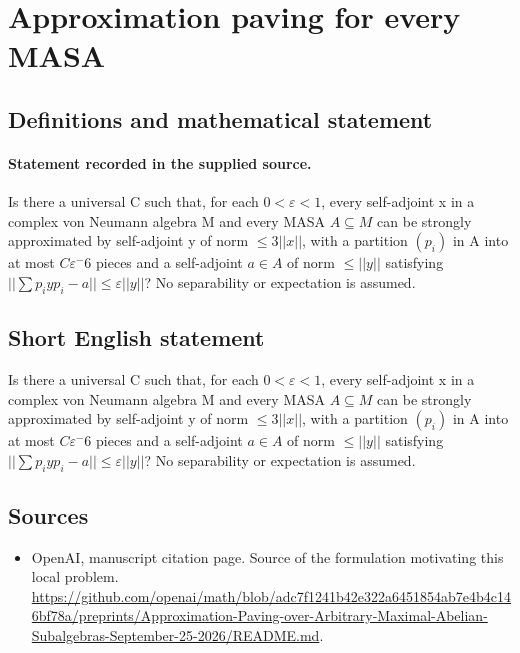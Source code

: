 \documentclass[11pt]{article}
\begin{document}
\section*{Approximation paving for every MASA}\label{statement}
\subsection{Definitions and mathematical statement}
\paragraph{Statement recorded in the supplied source.}
Is there a universal C such that, for each $0<\varepsilon <1$, every self-adjoint x in a complex von Neumann algebra M and every MASA $A\subseteq M$ can be strongly approximated by self-adjoint y of norm $\leq 3||x||$, with a partition $(p_i)$ in A into at most $C\varepsilon ^-6$ pieces and a self-adjoint $a\in A$ of norm $\leq ||y||$ satisfying $||\sum p_iyp_i-a||\leq \varepsilon ||y||$? No separability or expectation is assumed.
\subsection{Short English statement}
Is there a universal C such that, for each $0<\varepsilon <1$, every self-adjoint x in a complex von Neumann algebra M and every MASA $A\subseteq M$ can be strongly approximated by self-adjoint y of norm $\leq 3||x||$, with a partition $(p_i)$ in A into at most $C\varepsilon ^-6$ pieces and a self-adjoint $a\in A$ of norm $\leq ||y||$ satisfying $||\sum p_iyp_i-a||\leq \varepsilon ||y||$? No separability or expectation is assumed.
\subsection{Sources}
\begin{itemize}
\item[S1] OpenAI, manuscript citation page. Source of the formulation motivating this local problem.
\url{https://github.com/openai/math/blob/adc7f1241b42e322a6451854ab7e4b4c146bf78a/preprints/Approximation-Paving-over-Arbitrary-Maximal-Abelian-Subalgebras-September-25-2026/README.md}.
\end{itemize}
\end{document}
